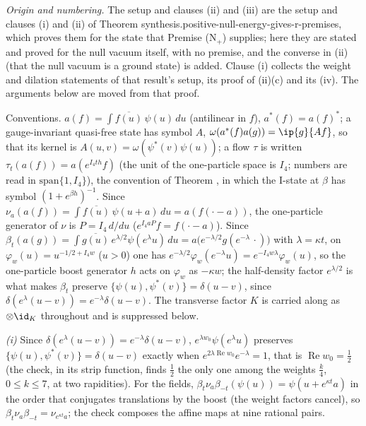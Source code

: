 \emph{Origin and numbering.} The setup and clauses (ii) and (iii) are the setup and clauses (i) and (ii) of Theorem synthesis.positive-null-energy-gives-r-premises, which proves them for the state that Premise (N$_{+}$) supplies; here they are stated and proved for the null vacuum itself, with no premise, and the converse in (ii) (that the null vacuum is a ground state) is added. Clause (i) collects the weight and dilation statements of that result's setup, its proof of (ii)(c) and its (iv). The arguments below are moved from that proof.

Conventions. $a(f) = \int \overline{f(u)}\,\psi(u)\,du$ (antilinear in $f$), $a^{*}(f) = a(f)^{*}$; a gauge-invariant quasi-free state has symbol $A$, $\omega(a^{*}(f)a(g)) = \ip{g}{Af}$, so that its kernel is $A(u, v) = \omega(\psi^{*}(v)\psi(u))$; a flow $\tau$ is written $\tau_{t}(a(f)) = a(e^{I_{4}th}f)$ (the unit of the one-particle space is $I_{4}$; numbers are read in $\mathrm{span}\{1, I_{4}\}$), the convention of Theorem , in which the I-state at $\beta$ has symbol $(1 + e^{\beta h})^{-1}$. Since $\nu_{a}(a(f)) = \int\overline{f(u)}\,\psi(u + a)\,du = a(f(\cdot - a))$, the one-particle generator of $\nu$ is $P = I_{4}\,d/du$ ($e^{I_{4}aP}f = f(\cdot - a)$). Since $\beta_{t}(a(g)) = \int\overline{g(u)}\,e^{\lambda/2}\psi(e^{\lambda}u)\,du = a\bigl(e^{-\lambda/2}g(e^{-\lambda}\,\cdot)\bigr)$ with $\lambda = \kappa t$, on $\varphi_{w}(u) = u^{-1/2 + I_{4}w}$ ($u > 0$) one has $e^{-\lambda/2}\varphi_{w}(e^{-\lambda}u) = e^{-I_{4}w\lambda}\varphi_{w}(u)$, so the one-particle boost generator $h$ acts on $\varphi_{w}$ as $-\kappa w$; the half-density factor $e^{\lambda/2}$ is what makes $\beta_{t}$ preserve $\{\psi(u), \psi^{*}(v)\} = \delta(u - v)$, since $\delta(e^{\lambda}(u - v)) = e^{-\lambda}\delta(u - v)$. The transverse factor $K$ is carried along as $\otimes\id_{K}$ throughout and is suppressed below.

\emph{(i)} Since $\delta(e^{\lambda}(u - v)) = e^{-\lambda}\delta(u - v)$, $e^{\lambda w_{0}}\psi(e^{\lambda}u)$ preserves $\{\psi(u), \psi^{*}(v)\} = \delta(u - v)$ exactly when $e^{2\lambda\operatorname{Re}w_{0}}e^{-\lambda} = 1$, that is $\operatorname{Re}w_{0} = \tfrac12$ (the check, in its strip function, finds $\tfrac12$ the only one among the weights $\tfrac{k}{4}$, $0 \le k \le 7$, at two rapidities). For the fields, $\beta_{t}\nu_{a}\beta_{-t}(\psi(u)) = \psi(u + e^{\kappa t}a)$ in the order that conjugates translations by the boost (the weight factors cancel), so $\beta_{t}\nu_{a}\beta_{-t} = \nu_{e^{\kappa t}a}$; the check composes the affine maps at nine rational pairs.

